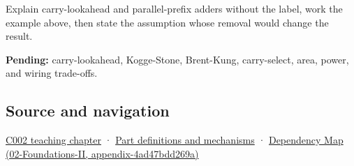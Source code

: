 Explain carry-lookahead and parallel-prefix adders without the label, work the example above, then state the assumption whose removal would change the result.

\textbf{Pending:} carry-lookahead, Kogge-Stone, Brent-Kung, carry-select, area, power, and wiring trade-offs.

\subsection{Source and navigation}\label{source-and-navigation}

\href{Continuous\%20Notes/Computing\%20Foundations\%20-\%20From\%20Bits\%20to\%20C++\%20and\%20Systems\%20APIs\#Arithmetic\%20becomes\%20a\%20policy}{C002 teaching chapter} · \hyperref[appendix-fd090d982a15]{Part definitions and mechanisms} · \href{}{Dependency Map (02-Foundations-II, appendix-4ad47bdd269a)}
